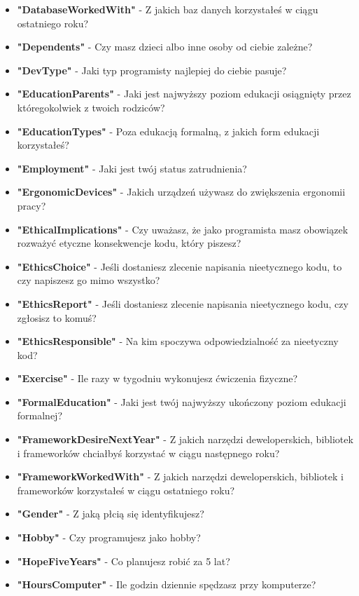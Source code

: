\begin{appendices}
\begin{itemize}
        \item \textbf{"DatabaseWorkedWith"} - Z jakich baz danych korzystałeś w ciągu ostatniego roku?
        \item \textbf{"Dependents"} - Czy masz dzieci albo inne osoby od ciebie zależne?
        \item \textbf{"DevType"} - Jaki typ programisty najlepiej do ciebie pasuje?
        \item \textbf{"EducationParents"} - Jaki jest najwyższy poziom edukacji osiągnięty przez któregokolwiek z twoich rodziców?
        \item \textbf{"EducationTypes"} - Poza edukacją formalną, z jakich form edukacji korzystałeś?
        \item \textbf{"Employment"} - Jaki jest twój status zatrudnienia?
        \item \textbf{"ErgonomicDevices"} - Jakich urządzeń używasz do zwiększenia ergonomii pracy?
        \item \textbf{"EthicalImplications"} - Czy uważasz, że jako programista masz obowiązek rozważyć etyczne konsekwencje kodu, który piszesz?
        \item \textbf{"EthicsChoice"} - Jeśli dostaniesz zlecenie napisania nieetycznego kodu, to czy napiszesz go mimo wszystko?
        \item \textbf{"EthicsReport"} - Jeśli dostaniesz zlecenie napisania nieetycznego kodu, czy zgłosisz to komuś?
        \item \textbf{"EthicsResponsible"} - Na kim spoczywa odpowiedzialność za nieetyczny kod?
        \item \textbf{"Exercise"} - Ile razy w tygodniu wykonujesz ćwiczenia fizyczne?
        \item \textbf{"FormalEducation"} - Jaki jest twój najwyższy ukończony poziom edukacji formalnej?
        \item \textbf{"FrameworkDesireNextYear"} - Z jakich narzędzi deweloperskich, bibliotek i frameworków chciałbyś korzystać w ciągu następnego roku?
        \item \textbf{"FrameworkWorkedWith"} - Z jakich narzędzi deweloperskich, bibliotek i frameworków korzystałeś w ciągu ostatniego roku?
        \item \textbf{"Gender"} - Z jaką płcią się identyfikujesz?
        \item \textbf{"Hobby"} - Czy programujesz jako hobby?
        \item \textbf{"HopeFiveYears"} - Co planujesz robić za 5 lat?
        \item \textbf{"HoursComputer"} - Ile godzin dziennie spędzasz przy komputerze?

\end{itemize}
\end{appendices}
